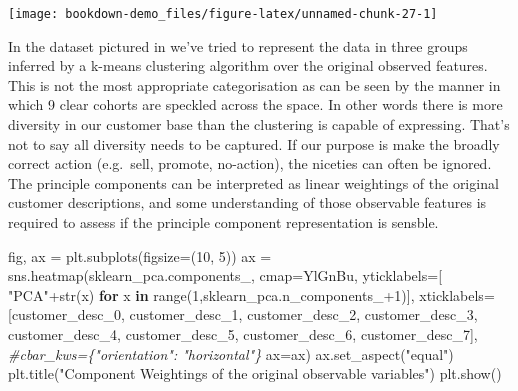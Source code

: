 \documentclass[]{tufte-book}
\newenvironment{Shaded}{}{}
\newcommand{\BuiltInTok}[1]{#1}
\newcommand{\CommentTok}[1]{\textcolor[rgb]{0.38,0.63,0.69}{\textit{#1}}}
\newcommand{\ControlFlowTok}[1]{\textcolor[rgb]{0.00,0.44,0.13}{\textbf{#1}}}
\newcommand{\DecValTok}[1]{\textcolor[rgb]{0.25,0.63,0.44}{#1}}
\newcommand{\KeywordTok}[1]{\textcolor[rgb]{0.00,0.44,0.13}{\textbf{#1}}}
\newcommand{\NormalTok}[1]{#1}
\newcommand{\OperatorTok}[1]{\textcolor[rgb]{0.40,0.40,0.40}{#1}}
\newcommand{\StringTok}[1]{\textcolor[rgb]{0.25,0.44,0.63}{#1}}
\theoremstyle{definition}
\theoremstyle{definition}
\theoremstyle{definition}
\theoremstyle{remark}
\begin{document}
\texttt{[image: bookdown-demo\_files/figure-latex/unnamed-chunk-27-1]}

In the dataset pictured in we've tried to represent the data in three groups inferred by a k-means clustering algorithm over the original observed features. This is not the most appropriate categorisation as can be seen by the manner in which 9 clear cohorts are speckled across the space. In other words there is more diversity in our customer base than the clustering is capable of expressing. That's not to say all diversity needs to be captured. If our purpose is make the broadly correct action (e.g.~sell, promote, no-action), the niceties can often be ignored. The principle components can be interpreted as linear weightings of the original customer descriptions, and some understanding of those observable features is required to assess if the principle component representation is sensble.

\begin{Shaded}
\begin{Highlighting}[]
\NormalTok{fig, ax }\OperatorTok{=}\NormalTok{ plt.subplots(figsize}\OperatorTok{=}\NormalTok{(}\DecValTok{10}\NormalTok{, }\DecValTok{5}\NormalTok{))}
\NormalTok{ax }\OperatorTok{=}\NormalTok{ sns.heatmap(sklearn\_pca.components\_,}
\NormalTok{                 cmap}\OperatorTok{=}\StringTok{\textquotesingle{}YlGnBu\textquotesingle{}}\NormalTok{,}
\NormalTok{                 yticklabels}\OperatorTok{=}\NormalTok{[ }\StringTok{"PCA"}\OperatorTok{+}\BuiltInTok{str}\NormalTok{(x) }\ControlFlowTok{for}\NormalTok{ x }\KeywordTok{in} \BuiltInTok{range}\NormalTok{(}\DecValTok{1}\NormalTok{,sklearn\_pca.n\_components\_}\OperatorTok{+}\DecValTok{1}\NormalTok{)],}
\NormalTok{  xticklabels}\OperatorTok{=}\NormalTok{[}\StringTok{\textquotesingle{}customer\_desc\_0\textquotesingle{}}\NormalTok{, }\StringTok{\textquotesingle{}customer\_desc\_1\textquotesingle{}}\NormalTok{, }\StringTok{\textquotesingle{}customer\_desc\_2\textquotesingle{}}\NormalTok{,}
  \StringTok{\textquotesingle{}customer\_desc\_3\textquotesingle{}}\NormalTok{, }\StringTok{\textquotesingle{}customer\_desc\_4\textquotesingle{}}\NormalTok{, }\StringTok{\textquotesingle{}customer\_desc\_5\textquotesingle{}}\NormalTok{,}
  \StringTok{\textquotesingle{}customer\_desc\_6\textquotesingle{}}\NormalTok{, }\StringTok{\textquotesingle{}customer\_desc\_7\textquotesingle{}}\NormalTok{],}
  \CommentTok{\#cbar\_kws=\{"orientation": "horizontal"\}}
\NormalTok{  ax}\OperatorTok{=}\NormalTok{ax)}
\NormalTok{ax.set\_aspect(}\StringTok{"equal"}\NormalTok{)}
\NormalTok{plt.title(}\StringTok{"Component Weightings of the original observable variables"}\NormalTok{)}
\NormalTok{plt.show()}
\end{Highlighting}
\end{Shaded}
\end{document}
